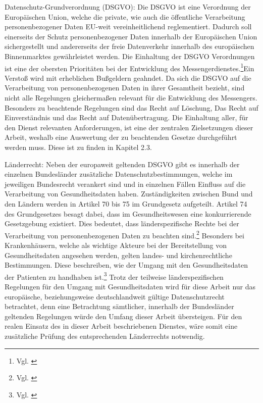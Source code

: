Datenschutz-Grundverordnung (DSGVO): Die DSGVO ist eine Verordnung der Europäischen Union, welche die private, wie auch die öffentliche Verarbeitung personenbezogener Daten EU-weit vereinheitlichend reglementiert. Dadurch soll einerseits der Schutz personenbezogener Daten innerhalb der Europäischen Union sichergestellt und andererseits der freie Datenverkehr innerhalb des europäischen Binnenmarktes gewährleistet werden. Die Einhaltung der DSGVO Verordnungen ist eine der obersten Prioritäten bei der Entwicklung des Messengerdienstes.\footnote{Vgl. \cite[S. 2 ff.]{Voigt2018}}Ein Verstoß wird mit erheblichen Bußgeldern geahndet. Da sich die DSGVO auf die Verarbeitung von personenbezogenen Daten in ihrer Gesamtheit bezieht, sind nicht alle Regelungen gleichermaßen relevant für die Entwicklung des Messengers. Besonders zu beachtende Regelungen sind \glqq das Recht auf Löschung\grqq{}, \glqq Das Recht auf Einverständnis\grqq{} und \glqq das Recht auf Datenübertragung\grqq. Die Einhaltung aller, für den Dienst relevanten Anforderungen, ist eine der zentralen Zielsetzungen dieser Arbeit, weshalb eine Auswertung der zu beachtenden Gesetze durchgeführt werden muss. Diese ist zu finden in Kapitel 2.3.

Länderrecht: Neben der europaweit geltenden DSGVO gibt es innerhalb der einzelnen Bundesländer zusätzliche Datenschutzbestimmungen, welche im jeweiligen Bundesrecht verankert sind und in einzelnen Fällen Einfluss auf die Verarbeitung von Gesundheitsdaten haben.
Zuständigkeiten zwischen Bund und den Ländern werden in Artikel 70 bis 75 im Grundgesetz aufgeteilt. Artikel 74 des Grundgesetzes besagt dabei, dass im Gesundheitswesen eine konkurrierende Gesetzgebung existiert. Dies bedeutet, dass länderspezifische Rechte bei der Verarbeitung von personenbezogenen Daten zu beachten sind.\footnote{Vgl. \cite[S. 8 f.]{Bundesverband-Gesundheits-IT-e.V.2016}} Besonders bei Krankenhäusern, welche als wichtige Akteure bei der Bereitstellung von Gesundheitsdaten angesehen werden, gelten landes- und kirchenrechtliche Bestimmungen. Diese beschreiben, wie der Umgang mit den Gesundheitsdaten der Patienten zu handhaben ist.\footnote{Vgl. \cite[S. 21]{Bundesaerztekammer2020}}
Trotz der teilweise länderspezifischen Regelungen für den Umgang mit Gesundheitsdaten wird für diese Arbeit nur das europäische, beziehungsweise deutschlandweit gültige Datenschutzrecht betrachtet, denn eine Betrachtung sämtlicher, innerhalb der Bundesländer geltenden Regelungen würde den Umfang dieser Arbeit übersteigen. Für den realen Einsatz des in dieser Arbeit beschriebenen Dienstes, wäre somit eine zusätzliche Prüfung des entsprechenden Länderrechts notwendig.

